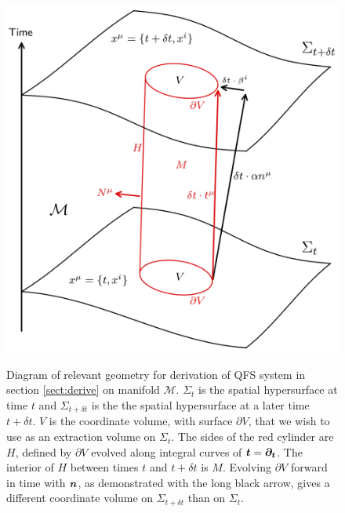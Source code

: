 \begin{figure}[h]
{\includegraphics[width=1.0\columnwidth]{png/qfs_simple.png}}
\caption{Diagram of relevant geometry for derivation of QFS system in section \ref{sect:derive} on manifold $\mathcal{M}$. $\Sigma_t$ is the spatial hypersurface at time $t$ and $\Sigma_{t+\delta t}$ is the the spatial hypersurface at a later time $t+\delta t$. $V$ is the coordinate volume, with surface $\partial V$, that we wish to use as an extraction volume on $\Sigma_t$. The sides of the red cylinder are $H$, defined by $\partial V$ evolved along integral curves of $\boldsymbol{t}=\boldsymbol{\partial_t}$. The interior of $H$ between times $t$ and $t+\delta t$ is $M$. Evolving $\partial V$ forward in time with $\boldsymbol n$, as demonstrated with the long black arrow, gives a different coordinate volume on $\Sigma_{t+\delta t}$ than on $\Sigma_t$.}
\label{fig:qfs_geometry}
\end{figure}

